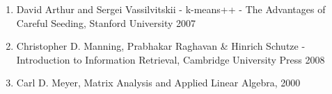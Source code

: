 \begin{enumerate}
\item David Arthur and Sergei Vassilvitskii - k-means++ - The Advantages of Careful Seeding, Stanford University 2007
\item Christopher D. Manning, Prabhakar Raghavan \& Hinrich Schutze - Introduction to Information Retrieval, Cambridge University Press 2008
\item Carl D. Meyer, Matrix Analysis and Applied Linear Algebra, 2000 
\end{enumerate}